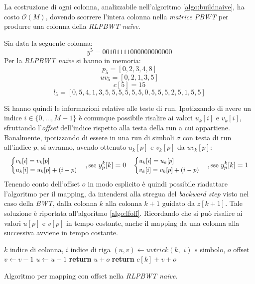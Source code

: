 La costruzione di ogni colonna, analizzabile nell'algoritmo
\ref{algo:buildnaive}, ha costo $\mathcal{O}(M)$, dovendo scorrere l'intera
colonna nella \textit{matrice PBWT} per produrre una colonna della
\textit{RLPBWT na\"{i}ve}.
\begin{esempio}
  Sia data la seguente colonna:
  \[y^5=00101111000000000000\]
  Per la \textit{RLPBWT na\"{i}ve} si hanno in memoria:
  \[p_5=[0,2,3,4,8]\]
  \[uv_5=[0,2,1,3,5]\]
  \[c[5]=15\]
  \[l_5=[0,5,4,1,3,5,5,5,5,5,5,0,5,5,5,2,5,1,5,5]\]
\end{esempio}
Si hanno quindi le informazioni relative alle teste di run. Ipotizzando di avere
un indice $i\in\{0,\ldots,M-1\}$ è comunque possibile risalire ai valori
$u_k[i]$ e $v_k[i]$, sfruttando l'\textit{offset} dell'indice rispetto alla
testa della run a cui appartiene. Banalmente, ipotizzando di essere in una run
di simboli $\sigma$ con testa di run all'indice $p$, si avranno, avendo
ottenuto $u_k[p]$ e $v_k[p]$ da $uv_k[p]$:
\begin{equation}
  \small
  \label{eq:naive2}
  \begin{cases}
    v_k[i]=v_k[p]\\
    u_k[i]=u_k[p]+(i-p)
  \end{cases},\mbox{sse } y^k_p[k]=0
  \quad
  \begin{cases}
    u_k[i]=u_k[p]\\
    v_k[i]=v_k[p]+(i-p)
  \end{cases},\mbox{sse } y^k_p[k]=1
\end{equation}
Tenendo conto dell'offset $o$ in modo esplicito è quindi possibile riadattare
l'algoritmo per il 
mapping, da intendersi alla stregua del \textit{backward step} visto nel caso
della \textit{BWT}, dalla colonna $k$ alla colonna $k+1$ guidato da
$z[k+1]$. Tale soluzione è riportata all'algoritmo \ref{algo:lfoff}.
Ricordando che si può risalire ai valori $u[p]$ e $v[p]$ in tempo costante,
anche il mapping da una colonna alla successiva avviene in tempo costante.\\
\begin{algorithm}
  \begin{algorithmic}[1]
    \Comment $k$ indice di colonna, $i$ indice di riga
    \State $(u,v)\gets uvtrick(k,\,\,i)$
    \Comment $s$ simbolo, $o$ offset
    \State $v\gets v-1$
    \Else
    \State $u\gets u-1$
    \EndIf
    \EndIf
    \State \textbf{return} $u+o$
    \Else
    \State \textbf{return} $c[k]+v+o$
    \EndIf
    \EndFunction
  \end{algorithmic}
  \caption{Algoritmo per mapping con offset nella \textit{RLPBWT naive}.}
  \label{algo:lfoff}
\end{algorithm}
